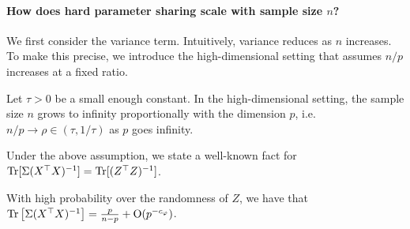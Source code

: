 \paragraph{How does hard parameter sharing scale with sample size $n$?}
We first consider the variance term.
Intuitively, variance reduces as $n$ increases.
To make this precise, we introduce the high-dimensional setting that assumes $n / p$ increases at a fixed ratio.
\begin{assumption}\label{assume_rm}
	Let $\tau > 0$ be a small enough constant.
	In the high-dimensional setting,
  the sample size $n$ grows to infinity proportionally with the dimension $p$, i.e. $n / p \rightarrow \rho \in (\tau, 1/\tau)$ as $p$ goes infinity.
\end{assumption}
Under the above assumption, we state a well-known fact for $\operatorname{Tr}[\Sigma (X^{\top} X)^{-1}] = \operatorname{Tr}[(Z^{\top} Z)^{-1}]$.

\begin{fact}\label{fact_tr}
	With high probability over the randomness of $Z$, we have that $\operatorname{Tr}\left[\Sigma (X^{\top} X)^{-1}\right] = \frac{p}{n - p} + \operatorname{O}(p^{-c_{\varphi}})$.
\end{fact}


